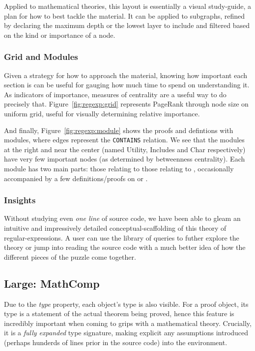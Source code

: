 Applied to mathematical theories, this layout is essentially a visual
study-guide, a plan for how to best tackle the material. It can be applied to
subgraphs, refined by declaring the maximum depth or the lowest layer to include
and filtered based on the kind or importance of a node.

\subsubsection{Grid and Modules}

Given a strategy for how to approach the material, knowing how important each
section is can be useful for gauging how much time to spend on understanding it.
As indicators of importance, measures of centrality are a useful way to do
precisely that. Figure~\ref{fig:regexp:grid} represents PageRank through node
size on uniform grid, useful for visually determining relative importance.

And finally, Figure~\ref{fig:regexp:module} shows the proofs and defintions
with modules, where edges represent the \texttt{CONTAINS} relation. We see that
the modules at the right and near the center (named Utility, Includes and Char
respectively) have very few important nodes (as determined by betweenness
centrality). Each module has two main parts: those relating to
 those relating to ,
occasionally accompanied by a few definitions/proofs on 
or .

\subsubsection{Insights}

Without studying even \emph{one line} of source code, we have been able to gleam
an intuitive and impressively detailed conceptual-scaffolding of this theory of
regular-expressions. A user can use the library of queries to futher explore the
theory or jump into reading the source code with a much better idea of how
the different pieces of the puzzle come together.

\subsection{Large: MathComp}

Due to the \emph{type} property, each object's type is also visible. For a proof
object, its type is a statement of the actual theorem being proved, hence this
feature is incredibly important when coming to grips with a mathematical theory.
Crucially, it is a \emph{fully expanded} type signature, making explicit any
assumptions introduced (perhaps hunderds of lines prior in the source code) into
the environment.

